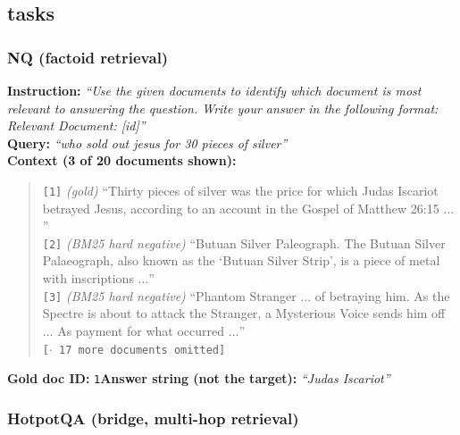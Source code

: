 \subsection{ tasks}

\subsubsection{NQ (factoid retrieval)}

\textbf{Instruction:} \emph{``Use the given documents to identify which document is most relevant to
answering the question. Write your answer in the following format: Relevant Document: [id]''}\\
\textbf{Query:} \emph{``who sold out jesus for 30 pieces of silver''}\\
\textbf{Context (3 of 20 documents shown):}
\begin{quote}\small
\texttt{[1]} \emph{(gold)} ``Thirty pieces of silver was the price for which Judas Iscariot betrayed
Jesus, according to an account in the Gospel of Matthew 26:15 $\dots$''\\
\texttt{[2]} \emph{(BM25 hard negative)} ``Butuan Silver Paleograph. The Butuan Silver Palaeograph,
also known as the `Butuan Silver Strip', is a piece of metal with inscriptions $\dots$''\\
\texttt{[3]} \emph{(BM25 hard negative)} ``Phantom Stranger $\dots$ of betraying him. As the Spectre
is about to attack the Stranger, a Mysterious Voice sends him off $\dots$ As payment for what
occurred $\dots$''\\
\texttt{[$\cdot$ 17 more documents omitted]}
\end{quote}
\textbf{Gold doc ID:} \texttt{1}\quad\textbf{Answer string (not the target):} \emph{``Judas Iscariot''}

\subsubsection{HotpotQA (bridge, multi-hop retrieval)}


